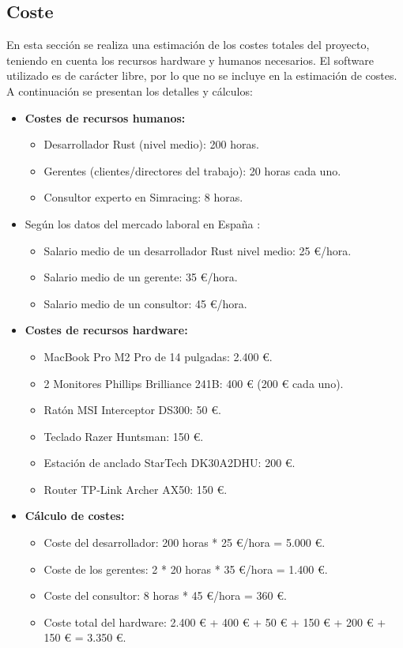 \subsection{Coste}
En esta sección se realiza una estimación de los costes totales del proyecto, teniendo en cuenta los recursos hardware y humanos necesarios. El software utilizado es de carácter libre, por lo que no se incluye en la estimación de costes. A continuación se presentan los detalles y cálculos:
\begin{itemize}
    \item \textbf{Costes de recursos humanos:}
    \begin{itemize}
    \item Desarrollador Rust (nivel medio): 200 horas.
    \item Gerentes (clientes/directores del trabajo): 20 horas cada uno.
    \item Consultor experto en Simracing: 8 horas.
    \end{itemize}

    \item Según los datos del mercado laboral en España \cite{randstad,glassdoor,kiwiremoto}:
    \begin{itemize}
    \item Salario medio de un desarrollador Rust nivel medio: 25 €/hora.
    \item Salario medio de un gerente: 35 €/hora.
    \item Salario medio de un consultor: 45 €/hora.
    \end{itemize}

    \item \textbf{Costes de recursos hardware:}
    \begin{itemize}
    \item MacBook Pro M2 Pro de 14 pulgadas: 2.400 €.
    \item 2 Monitores Phillips Brilliance 241B: 400 € (200 € cada uno).
    \item Ratón MSI Interceptor DS300: 50 €.
    \item Teclado Razer Huntsman: 150 €.
    \item Estación de anclado StarTech DK30A2DHU: 200 €.
    \item Router TP-Link Archer AX50: 150 €.
    \end{itemize}

    \item \textbf{Cálculo de costes:}
    \begin{itemize}
    \item Coste del desarrollador: 200 horas * 25 €/hora = 5.000 €.
    \item Coste de los gerentes: 2 * 20 horas * 35 €/hora = 1.400 €.
    \item Coste del consultor: 8 horas * 45 €/hora = 360 €.
    \item Coste total del hardware: 2.400 € + 400 € + 50 € + 150 € + 200 € + 150 € = 3.350 €.
    \end{itemize}
\end{itemize}

